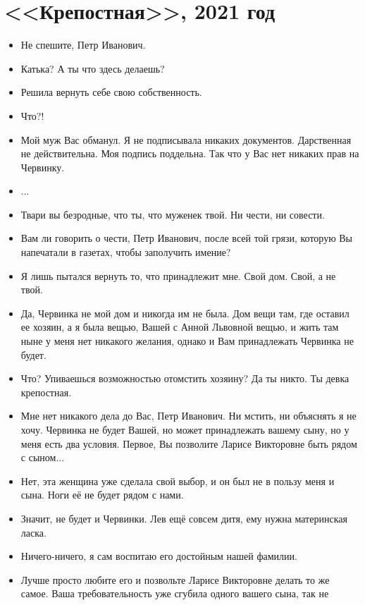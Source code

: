 \documentclass{bmstu}
\begin{document}
\section*{<<Крепостная>>, 2021 год}

\begin{itemize}
    \item Не спешите, Петр Иванович.
    \item Катька? А ты что здесь делаешь?
    \item Решила вернуть себе свою собственность.
    \item Что?!
    \item Мой муж Вас обманул. Я не подписывала никаких документов.
        Дарственная не действительна. Моя подпись поддельна. Так что у Вас
        нет никаких прав на Червинку.
    \item ...
    \item Твари вы безродные, что ты, что муженек твой. Ни чести, ни
        совести.
    \item Вам ли говорить о чести, Петр Иванович, после всей той грязи,
        которую Вы напечатали в газетах, чтобы заполучить имение?
    \item Я лишь пытался вернуть то, что принадлежит мне. Свой дом.
        Свой, а не твой.
    \item Да, Червинка не мой дом и никогда им не была. Дом вещи там, где
        оставил ее хозяин, а я была вещью, Вашей с Анной Львовной вещью, и
        жить там ныне у меня нет никакого желания, однако и Вам принадлежать
        Червинка не будет.
    \item Что? Упиваешься возможностью отомстить хозяину? Да ты никто. Ты
        девка крепостная.
    \item Мне нет никакого дела до Вас, Петр Иванович. Ни мстить, ни объяснять
        я не хочу. Червинка не будет Вашей, но может принадлежать вашему сыну,
        но у меня есть два условия. Первое, Вы позволите Ларисе Викторовне быть
        рядом с сыном...
    \item Нет, эта женщина уже сделала свой выбор, и он был не в
        пользу меня и сына. Ноги её не будет рядом с нами.
    \item Значит, не будет и Червинки. Лев ещё совсем дитя, ему нужна
        материнская ласка.
    \item Ничего-ничего, я сам воспитаю его достойным нашей фамилии.
    \item Лучше просто любите его и позвольте Ларисе Викторовне делать то же
        самое. Ваша требовательность уже сгубила одного вашего сына, так не

\end{itemize}
\end{document}
